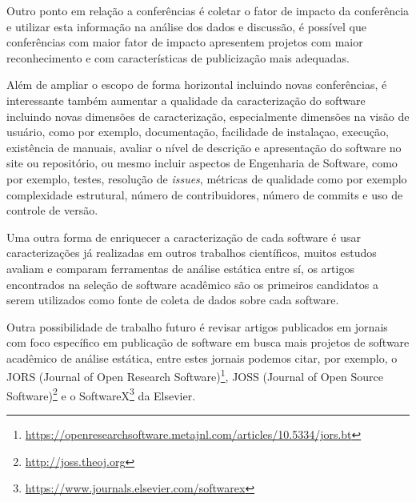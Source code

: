 Outro ponto em relação a conferências é coletar o fator de impacto da
conferência e utilizar esta informação na análise dos dados e discussão, é
possível que conferências com maior fator de impacto apresentem projetos com
maior reconhecimento e com características de publicização mais adequadas.

Além de ampliar o escopo de forma horizontal incluindo novas conferências, é
interessante também aumentar a qualidade da caracterização do software
incluindo novas dimensões de caracterização, especialmente dimensões na visão
de usuário, como por exemplo, documentação, facilidade de instalaçao, execução,
existência de manuais, avaliar o nível de descrição e apresentação do software
no site ou repositório, ou mesmo incluir aspectos de Engenharia de Software,
como por exemplo, testes, resolução de {\it issues}, métricas de qualidade como
por exemplo complexidade estrutural, número de contribuidores, número de
commits e uso de controle de versão.


Uma outra forma de enriquecer a caracterização de cada software é usar
caracterizações já realizadas em outros trabalhos científicos, muitos estudos
avaliam e comparam ferramentas de análise estática entre sí, os artigos
encontrados na seleção de software acadêmico são os primeiros candidatos a
serem utilizados como fonte de coleta de dados sobre cada software.



Outra possibilidade de trabalho futuro é revisar artigos publicados em jornais
com foco específico em publicação de software em busca mais projetos de
software acadêmico de análise estática, entre estes jornais podemos citar, por
exemplo, o JORS (Journal of Open Research
Software)\footnote{\url{https://openresearchsoftware.metajnl.com/articles/10.5334/jors.bt}},
JOSS (Journal of Open Source Software)\footnote{\url{http://joss.theoj.org}} e
o SoftwareX\footnote{\url{https://www.journals.elsevier.com/softwarex}} da
Elsevier. 

%
%
